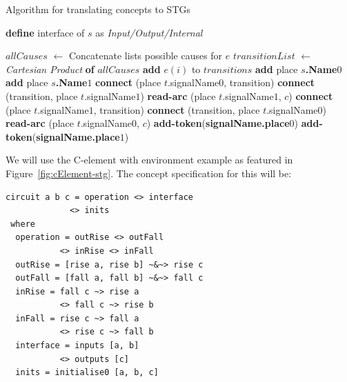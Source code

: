 \documentclass[british,conference,compsoc]{IEEEtran}
\begin{document}
\begin{algorithm}[t]
\begin{algorithmic}
\caption{Algorithm for translating concepts to STGs\label{alg:translation}}
  \State \textbf{define} interface of $s$ as \emph{Input/Output/Internal}
\EndFor

  \State $allCauses$ $\leftarrow$ Concatenate lists  possible causes for $e$
  \State $transitionList$ $\leftarrow$ \emph{Cartesian Product} \textbf{of} 
	$allCauses$
    \State \textbf{add} $e(i)$ to $transitions$
  \EndFor 
\EndFor
{}
  \State \textbf{add} place \textbf{$s$.Name}$0$
  \State \textbf{add} place \textbf{$s$.Name}$1$
\EndFor
{}
    \State \textbf{connect} (place $t$.signalName$0$, transition)
    \State \textbf{connect} (transition, place $t$.signalName$1$)
      \State \textbf{read-arc} (place $t$.signalName$1$, $c$)
    \EndFor
  \EndIf
    \State \textbf{connect} (place $t$.signalName$1$, transition)
    \State \textbf{connect} (transition, place $t$.signalName$0$)
      \State \textbf{read-arc} (place $t$.signalName$0$, $c$)
    \EndFor
  \EndIf
\EndFor
{}
    \State \textbf{add-token}(\textbf{signalName.place}$0$)
  \EndIf 
    \State \textbf{add-token}(\textbf{signalName.place}$1$)
  \EndIf
\EndFor
\end{algorithmic}
\end{algorithm}

We will use the C-element with environment example as featured in Figure~\ref{fig:cElement-stg}.
The concept specification for this will be:

\begin{verbatim}
circuit a b c = operation <> interface 
             <> inits
 where
  operation = outRise <> outFall 
           <> inRise <> inFall
  outRise = [rise a, rise b] ~&~> rise c
  outFall = [fall a, fall b] ~&~> fall c
  inRise = fall c ~> rise a 
           <> fall c ~> rise b
  inFall = rise c ~> fall a 
           <> rise c ~> fall b
  interface = inputs [a, b] 
           <> outputs [c]
  inits = initialise0 [a, b, c]
\end{verbatim}
\end{document}
